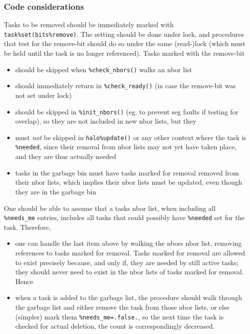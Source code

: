 \documentclass[paper=a4,fontsize=11pt]{scrartcl}
\numberwithin{equation}{section}		%
\numberwithin{figure}{section}			%
\numberwithin{table}{section}				%
\begin{document}
\subsubsection{Code considerations}
Tasks to be removed should be immediately marked with \verb|task%set(bits%remove)|. The setting should be done under lock, and procedures that test for the remove-bit should do so under the same (read-)lock (which must be held until the task is no longer referenced).  Tasks marked with the remove-bit   
\begin{itemize}
    \item should be skipped when \verb|%check_nbors()| walks an nbor list
    \item should immediately return in \verb|%check_ready()| (in case the remove-bit was not set under lock)
    \item should be skipped in \verb|%init_nbors()| (eg. to prevent seg faults if testing for overlap), so they are not included in new nbor lists, but they
    \item must \textit{not} be skipped in \verb|halo%update()| or any other context where the task is \verb|%needed|, since their removal from nbor lists may not yet have taken place, and they are thus actually needed
    \item tasks in the garbage bin must have tasks marked for removal removed from their nbor lists, which implies their nbor lists must be updated, even though they are in the garbage bin
\end{itemize}
One should be able to assume that a tasks nbor list, when including all \verb|%needs_me| entries, includes all tasks that could possibly have \verb|%needed| set for the task.   Therefore,
\begin{itemize}
    \item one can handle the last item above by walking the nbors nbor list, removing references to tasks marked for removal.   Tasks marked for removal are allowed to exist precisely because, and only if, they are needed by still active tasks; they should never need to exist in the nbor lists of tasks marked for removal.  Hence
    \item when a task is added to the garbage list, the procedure should walk through the garbage list and either remove the task from those nbor lists, or else (simpler) mark them \verb|%needs_me=.false.|, so the next time the task is checked for actual deletion, the count is correspondingly decreased.
\end{itemize}
\end{document}
